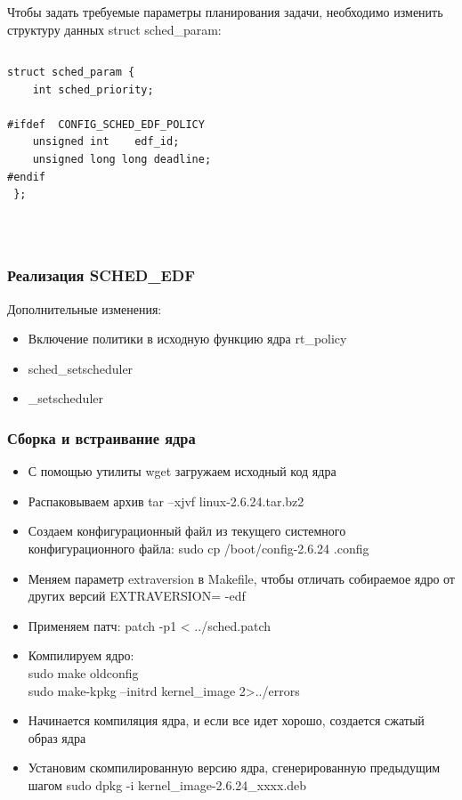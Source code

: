 \documentclass[10pt]{beamer}
\begin{document}
\begin{frame}[fragile]\frametitle{}
Чтобы задать требуемые параметры планирования задачи, необходимо изменить структуру данных struct sched\_param:
\center
	\begin{columns}
		\begin{lstlisting}[style=crs_cpp]
struct sched_param {
	int sched_priority;

#ifdef	CONFIG_SCHED_EDF_POLICY
	unsigned int	edf_id;
	unsigned long long deadline;
#endif
 };
 		\end{lstlisting}
 	\end{columns}
\colorbox{white}{\parbox{0.9\textwidth}{{\begin{center}  \end{center} }}}\\
\end{frame}


\begin{frame}\frametitle{Реализация SCHED\_EDF}
Дополнительные изменения:
\begin{itemize}
\item Включение политики в исходную функцию ядра rt\_policy 
\item sched\_setscheduler
\item \_setscheduler 
\end{itemize}
\end{frame}

\begin{frame}\frametitle{Сборка и встраивание ядра}
\begin{itemize}
\item С помощью утилиты wget загружаем исходный код ядра
\item Распаковываем архив
tar –xjvf linux-2.6.24.tar.bz2
\item Создаем конфигурационный файл из текущего системного конфигурационного файла:
sudo cp /boot/config-2.6.24 .config
\item Меняем параметр extraversion в Makefile, чтобы отличать собираемое ядро от других версий
EXTRAVERSION= -edf
\item Применяем патч:
patch -p1 < ../sched.patch
\item Компилируем ядро: \\
sudo make oldconfig \\
sudo make-kpkg –initrd kernel\_image 2>../errors
\item Начинается компиляция ядра, и если все идет хорошо, создается сжатый образ ядра
\item Установим скомпилированную версию ядра, сгенерированную предыдущим шагом
sudo dpkg -i kernel\_image-2.6.24\_xxxx.deb
\end{itemize}
\end{frame}
\end{document}
